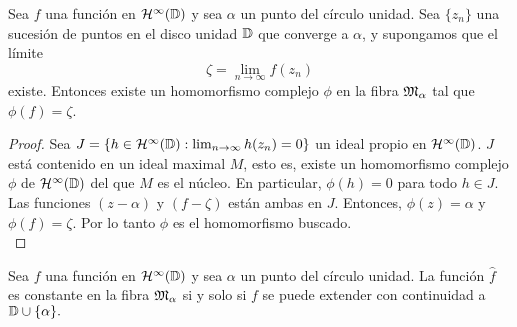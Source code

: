 \begin{comment}
Existe una correspondencia uno a uno entre los homomorfismos $\phi: \bholomorphic{\disk} \rightarrow \complex$ y los ideales maximales $M$ en el álgebra $\bholomorphic{\disk}$. Esta correspondencia está definida por $M = \ker (\phi)$. Cada ideal maximal $M$ es cerrado, así que cada homomorfismo $\phi$ es continuo:
\begin{equation*}
    \abs{\phi (x)} \leq \norm{x}.
\end{equation*}
\end{comment}


\begin{theorem}
    \label{result1}
    Sea $f$ una función en $\mathcal{H}^{\infty}(\mathbb{D})$ y sea $\alpha$ un punto del círculo unidad. Sea $\{z_n\}$ una sucesión de puntos en el disco unidad $\mathbb{D}$ que converge a $\alpha$, y supongamos que el límite
    \begin{equation*}
        \zeta = \lim_{n \rightarrow \infty} f(z_n)
    \end{equation*}
    existe. Entonces existe un homomorfismo complejo $\phi$ en la fibra $\mathfrak{M}_\alpha$ tal que $\phi(f) = \zeta$.
\end{theorem}

\begin{proof}
    Sea $J = \{h\in \mathcal{H}^{\infty}(\mathbb{D}) : \lim_{n \rightarrow \infty} h(z_n) = 0 \}$ un ideal propio en $\mathcal{H}^{\infty}(\mathbb{D})$. $J$ está contenido en un ideal maximal $M$, esto es, existe un homomorfismo complejo $\phi$ de  $\mathcal{H}^{\infty}(\mathbb{D})$ del que $M$ es el núcleo. En particular, $\phi(h) = 0$ para todo $h \in J$. Las funciones $(z - \alpha)$ y $(f - \zeta)$ están ambas en $J$. Entonces, $\phi(z) = \alpha$ y $\phi(f) = \zeta$. Por lo tanto $\phi$ es el homomorfismo buscado. \\ %
\end{proof}

\begin{theorem}
    Sea $f$ una función en $\mathcal{H}^{\infty}(\mathbb{D})$ y sea $\alpha$ un punto del círculo unidad. La función $\widehat f$ es constante en la fibra $\mathfrak{M}_\alpha$ si y solo si $f$ se puede extender con continuidad a $\mathbb{D} \cup \{\alpha\}.$
\end{theorem}

